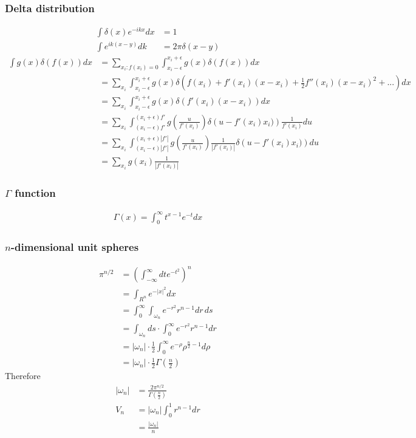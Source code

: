 \documentclass[10pt,a4paper]{article}
\theoremstyle{definition}
\begin{document}
\subsubsection{Delta distribution}
\begin{align}
    \int\delta(x)e^{-ikx}dx&=1\\
    \int e^{ik(x-y)}dk&=2\pi\delta(x-y)
\end{align}
\begin{align}
    \int g(x)\delta(f(x))dx &= \sum_{x_i:f(x_i)=0}\int_{x_i-\epsilon}^{x_i+\epsilon} g(x)\delta(f(x))dx\\
    &= \sum_{x_i}\int_{x_i-\epsilon}^{x_i+\epsilon} g(x)\delta\left(f(x_i)+f'(x_i)(x-x_i)+\frac{1}{2}f''(x_i)(x-x_i)^2+...\right)dx\\
    &= \sum_{x_i}\int_{x_i-\epsilon}^{x_i+\epsilon} g(x)\delta\left(f'(x_i)(x-x_i)\right)dx\\
    &= \sum_{x_i}\int_{(x_i-\epsilon)f'}^{(x_i+\epsilon)f'} g\left(\frac{u}{f'(x_i)}\right)\delta\left(u-f'(x_i)x_i)\right)\frac{1}{f'(x_i)}du\\
    &= \sum_{x_i}\int_{(x_i-\epsilon)|f'|}^{(x_i+\epsilon)|f'|} g\left(\frac{u}{f'(x_i)}\right)\frac{1}{|f'(x_i)|}\delta\left(u-f'(x_i)x_i)\right)du\\
    &= \sum_{x_i} g(x_i)\frac{1}{|f'(x_i)|}
\end{align}

\subsubsection{$\Gamma$ function}
\begin{align}
    \Gamma(x)=\int_0^\infty t^{x-1}e^{-t} dx
\end{align}

\subsubsection{$n$-dimensional unit spheres}
\begin{align}
    \pi^{n/2}
    &=\left(\int_{-\infty}^\infty dt e^{-t^2}\right)^n\\
    &=\int_{R^n} e^{-|x|^2}dx\\
    &=\int_0^\infty\int_{\omega_n}e^{-r^2}r^{n-1}dr\,ds\\
    &=\int_{\omega_n}ds\cdot\int_0^\infty e^{-r^2}r^{n-1}dr\\
    &=|\omega_n|\cdot\frac{1}{2}\int_0^\infty e^{-\rho}\rho^{\frac{n}{2}-1}d\rho\\
    &=|\omega_n|\cdot\frac{1}{2}\Gamma\left(\frac{n}{2}\right)
\end{align}
Therefore
\begin{align}
|\omega_n| &= \frac{2\pi^{n/2}}{\Gamma\left(\frac{n}{2}\right)}\\
V_n 
&=|\omega_n|\int_0^1r^{n-1}dr\\
&=\frac{|\omega_n|}{n}
\end{align}
\end{document}
